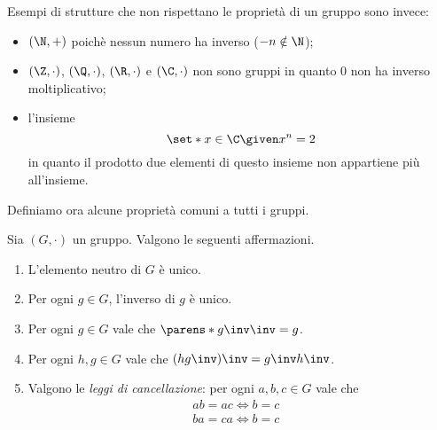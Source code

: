 Esempi di strutture che non rispettano le proprietà di un gruppo sono invece:
\begin{itemize}
    \item $(\N, +)$ poichè nessun numero ha inverso ($-n \notin \N$);
    \item $(\Z, \cdot)$, $(\Q, \cdot)$, $(\R, \cdot)$ e $(\C, \cdot)$ non sono gruppi in quanto $0$ non ha inverso moltiplicativo;
    \item l'insieme \[
        \set*{x \in \C \given x^n = 2}    
    \] in quanto il prodotto due elementi di questo insieme non appartiene più all'insieme.
\end{itemize}

Definiamo ora alcune proprietà comuni a tutti i gruppi.

\begin{proposition}
     \label{prop:prop_grp}
    Sia $(G, \cdot)$ un gruppo. Valgono le seguenti affermazioni.
    \begin{enumerate}[label={(\roman*)}, ref={\theproposition: (\roman*)}]
        \item \label{prop:prop_grp:e_unico} L'elemento neutro di $G$ è unico.
        \item \label{prop:prop_grp:inv_unico} Per ogni $g \in G$, l'inverso di $g$ è unico.
        \item \label{prop:prop_grp:inv_inv} Per ogni $g \in G$ vale che $\parens*{g\inv}\inv = g$.
        \item \label{prop:prop_grp:inv_prod} Per ogni $h, g \in G$ vale che $(hg\inv)\inv = g\inv h\inv$. 
        \item \label{prop:prop_grp:canc} Valgono le \emph{leggi di cancellazione}: per ogni $a, b, c \in G$ vale che \begin{align}
            ab = ac \iff b = c &\tag{sx} \label{prop:prop_grp:canc:sx}\\
            ba = ca \iff b = c &\tag{dx} \label{prop:prop_grp:canc:dx}
        \end{align}
    \end{enumerate}
\end{proposition}
